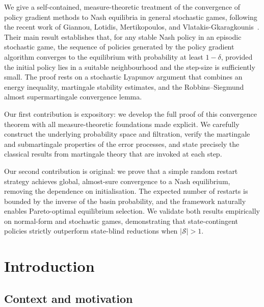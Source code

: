 \documentclass[a4paper,oneside,11pt]{report}
\newcommand{\calS}{\mathcal{S}}
\numberwithin{theorem}{chapter}
\numberwithin{equation}{chapter}
\begin{document}
\dissertationtitlepage

\begin{dissertationsummary}
We give a self-contained, measure-theoretic treatment of the convergence
of policy gradient methods to Nash equilibria in general stochastic games,
following the recent work of Giannou, Lotidis, Mertikopoulos, and
Vlatakis-Gkaragkounis~\cite{giannou2022}. Their main result establishes
that, for any stable Nash policy in an episodic stochastic game, the
sequence of policies generated by the policy gradient algorithm converges
to the equilibrium with probability at least $1-\delta$, provided the
initial policy lies in a suitable neighbourhood and the step-size is
sufficiently small. The proof rests on a stochastic Lyapunov argument
that combines an energy inequality, martingale stability estimates, and
the Robbins--Siegmund almost supermartingale convergence lemma.

Our first contribution is expository: we develop the full proof of this
convergence theorem with all measure-theoretic foundations made explicit.
We carefully construct the underlying probability space and filtration,
verify the martingale and submartingale properties of the error
processes, and state precisely the classical results from martingale
theory that are invoked at each step.

Our second contribution is original: we prove that a simple random
restart strategy achieves global, almost-sure convergence to a Nash
equilibrium, removing the dependence on initialisation. The expected
number of restarts is bounded by the inverse of the basin probability,
and the framework naturally enables Pareto-optimal equilibrium
selection. We validate both results empirically on normal-form and
stochastic games, demonstrating that state-contingent policies
strictly outperform state-blind reductions when $|\calS| > 1$.
\end{dissertationsummary}

\dissertationtableofcontents

\chapter{Introduction}
\label{ch:intro}

\section{Context and motivation}
\end{document}
